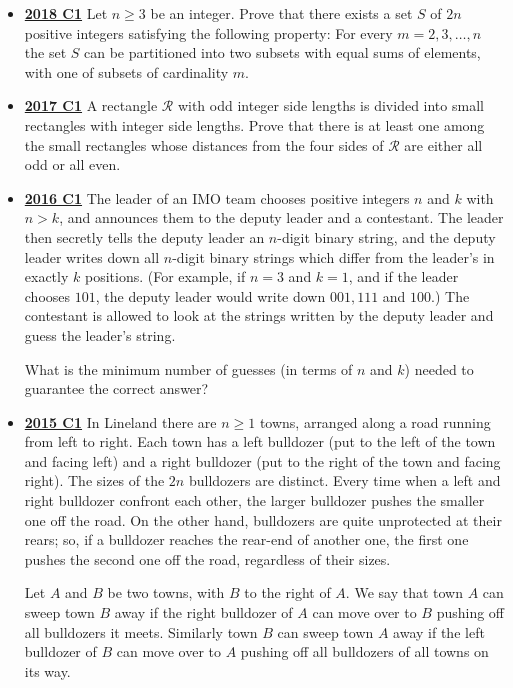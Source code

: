 \documentclass[11pt]{scrartcl}
\begin{document}
\begin{itemize}[leftmargin=*]
    \item \href{https://artofproblemsolving.com/community/c6h1876759p12752812}{\textbf{2018 C1}} 	Let $n\geqslant  3$ be an integer. Prove that there exists a set $S$ of $2n$ positive integers satisfying the following property: For every $m=2,3,\dots,n$ the set $S$ can be partitioned into two subsets with equal sums of elements, with one of subsets of cardinality $m$.
    
    \item \href{https://artofproblemsolving.com/community/c6h1671298p10632375}{\textbf{2017 C1}} A rectangle $\mathcal{R}$ with odd integer side lengths is divided into small rectangles with integer side lengths. Prove that there is at least one among the small rectangles whose distances from the four sides of $\mathcal{R}$ are either all odd or all even.
    
    \item \href{https://artofproblemsolving.com/community/c6h1480687p8639246}{\textbf{2016 C1}} The leader of an IMO team chooses positive integers $n$ and $k$ with $n>k$, and announces them to the deputy leader and a contestant. The leader then secretly tells the deputy leader an $n$-digit binary string, and the deputy leader writes down all $n$-digit binary strings which differ from the leader's in exactly $k$ positions. (For example, if $n = 3$ and $k = 1$, and if the leader chooses $101$, the deputy leader would write down $001, 111$ and $100$.) The contestant is allowed to look at the strings written by the deputy leader and guess the leader's string.
    
    What is the minimum number of guesses (in terms of $n$ and $k$) needed to guarantee the correct answer?
    \item \href{https://artofproblemsolving.com/community/c6h1268873p6622370}{\textbf{2015 C1}} In Lineland there are $n\geqslant 1$ towns, arranged along a road running from left to right. Each town has a left bulldozer (put to the left of the town and facing left) and a right bulldozer (put to the right of the town and facing right). The sizes of the $2n$ bulldozers are distinct. Every time when a left and right bulldozer confront each other, the larger bulldozer pushes the smaller one off the road. On the other hand, bulldozers are quite unprotected at their rears; so, if a bulldozer reaches the rear-end of another one, the first one pushes the second one off the road, regardless of their sizes. 
    
    Let $A$ and $B$ be two towns, with $B$ to the right of $A$. We say that town $A$ can sweep town $B$ away if the right bulldozer of $A$ can move over to $B$ pushing off all bulldozers it meets. Similarly town $B$ can sweep town $A$ away if the left bulldozer of $B$ can move over to $A$ pushing off all bulldozers of all towns on its way. 
    

\end{itemize}
\end{document}
